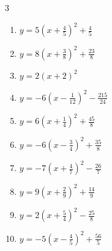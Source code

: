 \begin{multicols}{3}
\begin{enumerate}
  \item $\displaystyle y=5\left( x+\frac{4}{5}\right)^{2}+\frac{4}{5}$


  \item $\displaystyle y=8\left( x+\frac{3}{8}\right)^{2}+\frac{23}{8}$


  \item $\displaystyle y=2\left( x+2\right)^{2}$

        \phantom{$\displaystyle 頂点\left( -2 , 0 \right)$}

  \item $\displaystyle y=-6\left( x-\frac{1}{12}\right)^{2}-\frac{215}{24}$


  \item $\displaystyle y=6\left( x+\frac{1}{4}\right)^{2}+\frac{45}{8}$


  \item $\displaystyle y=-6\left( x-\frac{3}{4}\right)^{2}+\frac{35}{8}$


  \item $\displaystyle y=-7\left( x+\frac{4}{7}\right)^{2}-\frac{26}{7}$


  \item $\displaystyle y=9\left( x+\frac{2}{9}\right)^{2}+\frac{14}{9}$


  \item $\displaystyle y=2\left( x+\frac{5}{4}\right)^{2}-\frac{25}{8}$


\columnbreak %

\resetques

  \item $\displaystyle y=-5\left( x-\frac{4}{5}\right)^{2}+\frac{56}{5}$


\end{enumerate}
\end{multicols}

